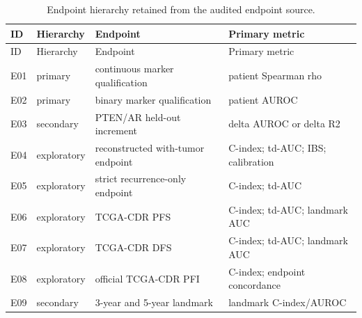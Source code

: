 \begingroup
\small
\begin{longtable}{@{}p{}p{}p{}p{}@{}}
\caption{Endpoint hierarchy retained from the audited endpoint source.}
\label{tab:supp-endpoint-hierarchy}\\
\toprule
ID & Hierarchy & Endpoint & Primary metric \\
\midrule
\endfirsthead
\toprule
ID & Hierarchy & Endpoint & Primary metric \\
\midrule
\endhead
E01 & primary & continuous marker qualification & patient Spearman rho \\
E02 & primary & binary marker qualification & patient AUROC \\
E03 & secondary & PTEN/AR held-out increment & delta AUROC or delta R2 \\
E04 & exploratory & reconstructed with-tumor endpoint & C-index; td-AUC; IBS; calibration \\
E05 & exploratory & strict recurrence-only endpoint & C-index; td-AUC \\
E06 & exploratory & TCGA-CDR PFS & C-index; td-AUC; landmark AUC \\
E07 & exploratory & TCGA-CDR DFS & C-index; td-AUC; landmark AUC \\
E08 & exploratory & official TCGA-CDR PFI & C-index; endpoint concordance \\
E09 & secondary & 3-year and 5-year landmark & landmark C-index/AUROC \\
\bottomrule
\end{longtable}
\endgroup
